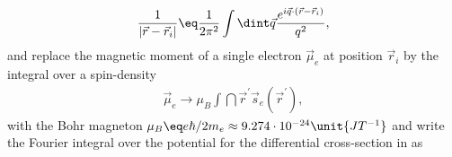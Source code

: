 \documentclass[\main/dresen_thesis.tex]{subfiles}
\begin{document}
    \begin{align}
      \frac{1}{|\vec{r} - \vec{r}_i|} \eq \frac{1}{2 \pi^2} \int \dint \vec{q} \frac{e^{i \vec{q} \cdot (\vec{r} - \vec{r}_i)}}{q^2},
    \end{align}
    and replace the magnetic moment of a single electron $\vec{\mu}_e$ at position $\vec{r}_i$ by the integral over a spin-density
    \begin{align}
      \vec{\mu}_e \rightarrow \mu_B \int \dint \vec{r}^\prime \vec{s}_e(\vec{r}^\prime),
    \end{align}
    with the Bohr magneton $\mu_B \eq e\hbar / 2 m_e \approx 9.274 \cdot 10^{-24} \unit{JT^{-1}}$ and write the Fourier integral over the potential for the differential cross-section in  as
\end{document}
